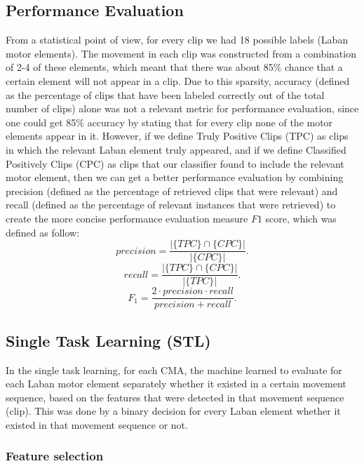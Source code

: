 \subsection{Performance Evaluation}
From a statistical point of view, for every clip we had 18 possible labels
(Laban motor elements). The movement in each clip was constructed from a
combination of 2-4 of these elements, which meant that there was about 85\%
chance that a certain element will not appear in a clip. Due to this sparsity,
accuracy (defined as the percentage of clips that have been labeled correctly
out of the total number of clips) alone was not a relevant metric for
performance evaluation, since one could get 85\% accuracy by stating that for
every clip none of the motor elements appear in it. However, if we define Truly
Positive Clips (TPC) as clips in which the relevant Laban element truly
appeared, and if we define Classified Positively Clips (CPC) as clips that our
classifier found to include the relevant motor element, then we can get a better
performance evaluation by combining precision (defined as the percentage of
retrieved clips that were relevant) and recall (defined as the percentage of
relevant instances that were retrieved) to create the more concise performance
evaluation measure $F1$ score, which was defined as follow:
\begin{equation}
precision = \frac{|\{TPC\}\cap\{CPC\}|}{|\{CPC\}|}.
\end{equation}
\begin{equation}
recall = \frac{|\{TPC\}\cap\{CPC\}|}{|\{TPC\}|}.
\end{equation}
\begin{equation}
F_{1} = \frac{2\cdot precision\cdot recall}{precision+recall}.
\end{equation}
\subsection{Single Task Learning (STL)}
In the single task learning, for each CMA, the machine learned to evaluate for
each Laban motor element separately whether it existed in a certain movement
sequence, based on the features that were detected in that movement sequence
(clip). This was done by a binary decision for every Laban element whether it
existed in that movement sequence or not.
\subsubsection{Feature selection}

